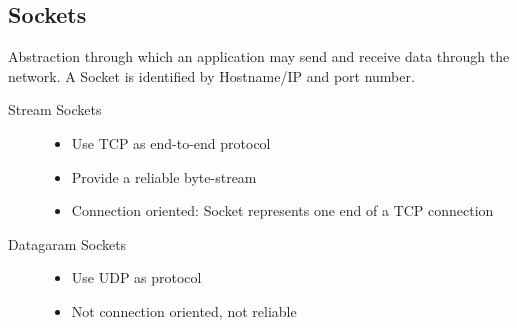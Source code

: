 \documentclass[10pt]{article}
\begin{document}
\subsection{Sockets}
Abstraction through which an application may send and receive data through the network. A Socket is identified by Hostname/IP and port number.
\begin{description}
	\item[Stream Sockets] \hfill
	\begin{itemize}
		\item Use TCP as end-to-end protocol
		\item Provide a reliable byte-stream
		\item Connection oriented: Socket represents one end of a TCP connection
	\end{itemize}
	\item[Datagaram Sockets] \hfill 
	\begin{itemize}
		\item Use UDP as protocol
		\item Not connection oriented, not reliable
	\end{itemize}
\end{description}
\end{document}
